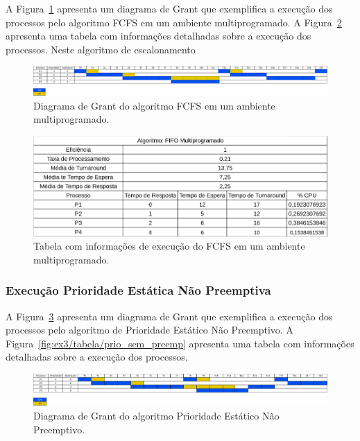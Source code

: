 \documentclass[
	12pt,				%
	oneside,   	        %
	a4paper,			%
	english,			%
	french,				%
	spanish,			%
	brazil,				%
	]{pacotes/abntex2}
\begin{document}
A Figura~\ref{fig:ex3/diagrama/fcfs_multi} apresenta um diagrama de Grant que exemplifica a execução dos processos pelo algoritmo FCFS em um ambiente multiprogramado. A Figura~\ref{fig:ex3/tabela/fcfs_multi} apresenta uma tabela com informações detalhadas sobre a execução dos processos. Neste algoritmo de escalonamento 

\begin{figure}[H]
  \centering
  \includegraphics[scale=0.20]{figuras/ex3/diagrama/fcfs_multi.png}
  \caption{Diagrama de Grant do algoritmo FCFS em um ambiente multiprogramado.}
  \label{fig:ex3/diagrama/fcfs_multi}
\end{figure}

\begin{figure}[H]
  \centering
  \includegraphics[scale=0.5]{figuras/ex3/tabela/fcfs_multi.png}
  \caption{Tabela com informações de execução do FCFS em um ambiente multiprogramado.}
  \label{fig:ex3/tabela/fcfs_multi}
\end{figure}

\subsubsection{Execução Prioridade Estática Não Preemptiva}
\label{subsubsec:prio_sem_preemp}

A Figura~\ref{fig:ex3/diagrama/prio_sem_preemp} apresenta um diagrama de Grant que exemplifica a execução dos processos pelo algoritmo de Prioridade Estático Não Preemptivo. A Figura~\ref{fig:ex3/tabela/prio_sem_preemp} apresenta uma tabela com informações detalhadas sobre a execução dos processos.

\begin{figure}[H]
  \centering
  \includegraphics[scale=0.20]{figuras/ex3/diagrama/prio_sem_preemp.png}
  \caption{Diagrama de Grant do algoritmo Prioridade Estático Não Preemptivo.}
  \label{fig:ex3/diagrama/prio_sem_preemp}
\end{figure}
\end{document}

